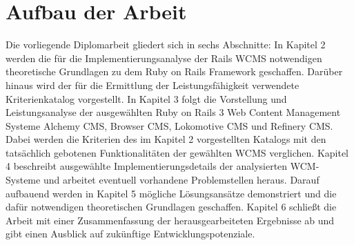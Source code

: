 \section{Aufbau der Arbeit}
Die vorliegende Diplomarbeit gliedert sich in sechs Abschnitte:
\newline
\newline
In Kapitel 2 werden die für die Implementierungsanalyse der Rails WCMS notwendigen theoretische Grundlagen zu dem Ruby on Rails Framework geschaffen. Darüber hinaus wird der für die Ermittlung der Leistungsfähigkeit verwendete Kriterienkatalog vorgestellt.
\newline
\newline
In Kapitel 3 folgt die Vorstellung und Leistungsanalyse der ausgewählten Ruby on Rails 3 Web Content Management Systeme Alchemy CMS, Browser CMS, Lokomotive CMS und Refinery CMS. Dabei werden die Kriterien des im Kapitel 2 vorgestellten Katalogs mit den tatsächlich gebotenen Funktionalitäten der gewählten WCMS verglichen.
\newline
Kapitel 4 beschreibt ausgewählte Implementierungsdetails der analysierten WCM-Systeme und arbeitet eventuell vorhandene Problemstellen heraus.
Darauf aufbauend werden in Kapitel 5 mögliche Lösungsansätze demonstriert und die dafür notwendigen theoretischen Grundlagen geschaffen.
Kapitel 6 schließt die Arbeit mit einer Zusammenfassung der herausgearbeiteten Ergebnisse ab und gibt einen Ausblick auf zukünftige Entwicklungspotenziale.
%
%

